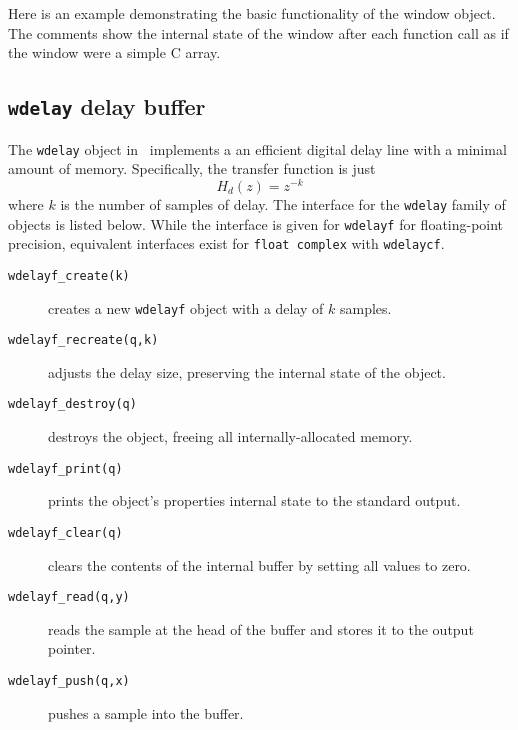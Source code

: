 Here is an example demonstrating the basic functionality of the window object.
The comments show the internal state of the window after each function call as
if the window were a simple C array.
%



\subsection{{\tt wdelay} delay buffer}
\label{module:buffer:wdelay}
The {\tt wdelay} object in \liquid\ implements a an efficient digital
delay line with a minimal amount of memory.
Specifically, the transfer function is just
%
\begin{equation}
\label{eqn:buffer:wdelay}
    H_d(z) = z^{-k}
\end{equation}
%
where $k$ is the number of samples of delay.
%
The interface for the {\tt wdelay} family of objects is listed below.
While the interface is given for {\tt wdelayf} for floating-point
precision, equivalent interfaces exist for
{\tt float complex} with {\tt wdelaycf}.
%
\begin{description}
\item[{\tt wdelayf\_create(k)}]
    creates a new {\tt wdelayf} object with a delay of $k$ samples.
\item[{\tt wdelayf\_recreate(q,k)}]
    adjusts the delay size, preserving the internal state of the object.
\item[{\tt wdelayf\_destroy(q)}]
    destroys the object, freeing all internally-allocated memory.
\item[{\tt wdelayf\_print(q)}]
    prints the object's properties internal state to the standard
    output.
\item[{\tt wdelayf\_clear(q)}]
    clears the contents of the internal buffer by setting all values to
    zero.
\item[{\tt wdelayf\_read(q,y)}]
    reads the sample at the head of the buffer and stores it to the
    output pointer.
\item[{\tt wdelayf\_push(q,x)}]
    pushes a sample into the buffer.
\end{description}
